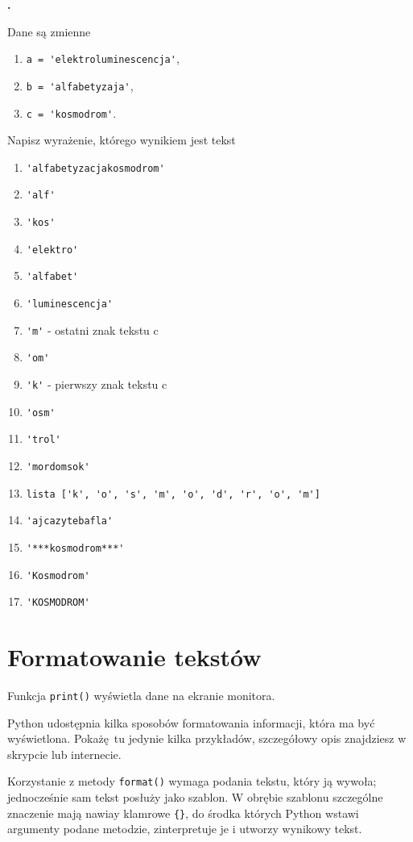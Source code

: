 \documentclass[a4paper]{article}
\begin{document}
\textbf{.}\addtocounter{zadanie}{1} Dane są zmienne
\begin{enumerate}[]
    \item \verb|a = 'elektroluminescencja'|,
    \item \verb|b = 'alfabetyzaja'|,
    \item \verb|c = 'kosmodrom'|.
\end{enumerate}

Napisz wyrażenie, którego wynikiem jest tekst
\begin{enumerate}[label=\arabic*.]
    \item \verb|'alfabetyzacjakosmodrom'|
    \item \verb|'alf'|
    \item \verb|'kos'|
    \item \verb|'elektro'|
    \item \verb|'alfabet'|
    \item \verb|'luminescencja'|
    \item \verb|'m'| - ostatni znak tekstu c
    \item \verb|'om'|
    \item \verb|'k'| - pierwszy znak tekstu c
    \item \verb|'osm'|
    \item \verb|'trol'|
    \item \verb|'mordomsok'|
    \item \verb|lista ['k', 'o', 's', 'm', 'o', 'd', 'r', 'o', 'm']|
    \item \verb|'ajcazytebafla'|

    \item \verb|'***kosmodrom***'|
    \item \verb|'Kosmodrom'|
    \item \verb|'KOSMODROM'|


\end{enumerate}

\section{Formatowanie tekstów}
Funkcja \lstinline|print()| wyświetla dane na ekranie monitora.

Python udostępnia kilka sposobów formatowania informacji, która ma być wyświetlona. Pokażę tu jedynie kilka przykładów, szczegółowy opis znajdziesz w skrypcie lub internecie.

Korzystanie z metody \lstinline|format()| wymaga podania tekstu, który ją wywoła; jednocześnie sam tekst posłuży jako szablon. W obrębie szablonu szczególne znaczenie mają nawiay klamrowe \verb|{}|, do środka których Python wstawi argumenty podane metodzie, zinterpretuje je i utworzy wynikowy tekst.
\end{document}
